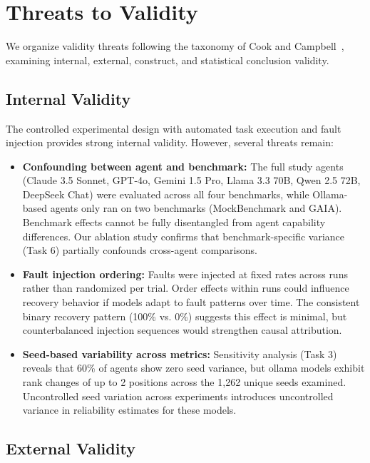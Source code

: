 \section{Threats to Validity}

We organize validity threats following the taxonomy of Cook and Campbell~\cite{cook1979quasi}, examining internal, external, construct, and statistical conclusion validity.

\subsection{Internal Validity}

The controlled experimental design with automated task execution and fault injection provides strong internal validity. However, several threats remain:

\begin{itemize}
    \item \textbf{Confounding between agent and benchmark:} The full study agents (Claude 3.5 Sonnet, GPT-4o, Gemini 1.5 Pro, Llama 3.3 70B, Qwen 2.5 72B, DeepSeek Chat) were evaluated across all four benchmarks, while Ollama-based agents only ran on two benchmarks (MockBenchmark and GAIA). Benchmark effects cannot be fully disentangled from agent capability differences. Our ablation study confirms that benchmark-specific variance (Task 6) partially confounds cross-agent comparisons.

    \item \textbf{Fault injection ordering:} Faults were injected at fixed rates across runs rather than randomized per trial. Order effects within runs could influence recovery behavior if models adapt to fault patterns over time. The consistent binary recovery pattern (100\% vs. 0\%) suggests this effect is minimal, but counterbalanced injection sequences would strengthen causal attribution.

    \item \textbf{Seed-based variability across metrics:} Sensitivity analysis (Task 3) reveals that 60\% of agents show zero seed variance, but ollama models exhibit rank changes of up to 2 positions across the 1,262 unique seeds examined. Uncontrolled seed variation across experiments introduces uncontrolled variance in reliability estimates for these models.
\end{itemize}

\subsection{External Validity}

